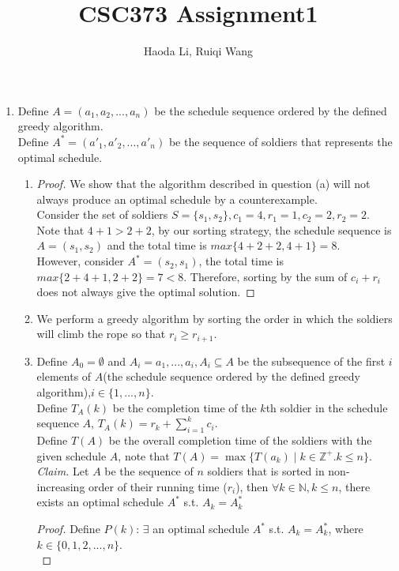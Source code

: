\documentclass[11pt]{article}
\title{CSC373 Assignment1}
\author{Haoda Li, Ruiqi Wang}
\begin{document}
\maketitle
\begin{enumerate}
    \item
    Define $A = (a_1,a_2,...,a_n)$ be the schedule sequence ordered by the defined greedy algorithm. \\
    Define $A^* = (a'_1,a'_2,...,a'_n)$ be the sequence of soldiers that represents the optimal schedule.\\
    \begin{enumerate}
    
    
        \item \begin{proof} We show that the algorithm described in question (a) will not always produce an optimal schedule by a counterexample.\\
            Consider the set of soldiers $S = \{s_1,s_2\}, c_1 = 4, r_1 = 1, c_2 = 2, r_2 = 2$.\\
            Note that $4+1 > 2+2$, by our sorting strategy, the schedule sequence is $A = (s_1,s_2)$ and the total time is $max\{4+2+2, 4+1\} = 8$. \\
            However, consider $A^* = (s_2, s_1)$, the total time is $max\{2 + 4 + 1, 2 + 2\} = 7 < 8$. Therefore, sorting by the sum of $c_i + r_i$ does not always give the optimal solution.
        \end{proof}
        
        
        \item We perform a greedy algorithm by sorting the order in which the soldiers will climb the rope so that $r_i\geq r_{i+1}$. 


        \item Define $A_0=\emptyset$ and $A_i = {a_1,...,a_i}, A_i\subseteq A$ be the subsequence of the first $i$ elements of $A$(the schedule sequence ordered by the defined greedy algorithm),$i\in\{1,...,n\}.$\\
        Define $T_A(k)$ be the completion time of the $k$th soldier in the schedule sequence $A$, $T_A(k) = r_k + \sum_{i=1}^k c_i$. \\
        Define $T(A)$ be the overall completion time of the soldiers with the given schedule $A$, note that $T(A) = \max\{T(a_k) \mid k\in\mathbb{Z}^+. k\leq n\}$.\\
        \textit{Claim.} Let $A$ be the sequence of $n$ soldiers that is sorted in non-increasing order of their running time ($r_i$), then $\forall k\in\mathbb{N}, k\leq n$, there exists an optimal schedule $A^*$ s.t. $A_k = A_k^*$
        \begin{proof} Define $P(k)$: $\exists$ an optimal schedule $A^*$  s.t. $ A_k = A_k^*$, where $k\in\{0,1,2,...,n\}$.  \\
        

\end{proof}
\end{enumerate}
\end{enumerate}
\end{document}
